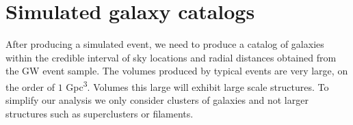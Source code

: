 





\section{\label{sec:clust_gen} Simulated galaxy catalogs}
After producing a simulated event, we need to produce a catalog of galaxies within the credible interval of sky locations and radial distances obtained from the GW event sample. The volumes produced by typical events are very large, on the order of $1$ \si{Gpc^3}. Volumes this large will exhibit large scale structures. To simplify our analysis we only consider clusters of galaxies and not larger structures such as superclusters or filaments.

